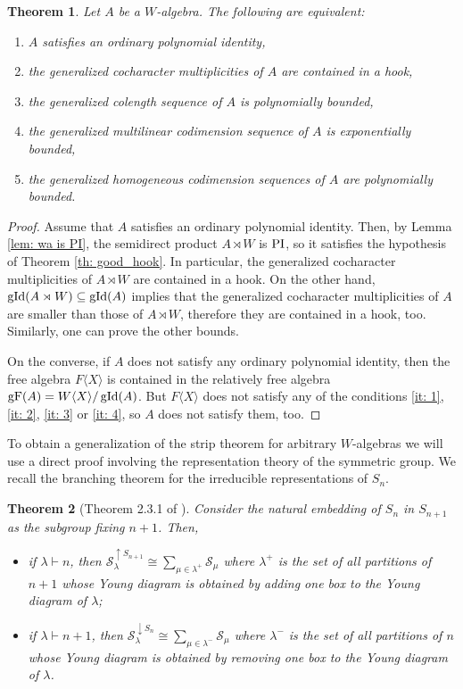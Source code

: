 \documentclass{article}
\newtheorem{theorem}{Theorem}[section]
\newcommand{\wa}{A\rtimes W}
\newcommand{\WX}{W\langle X\rangle}
\newcommand{\cS}{\mathcal{S}}
\DeclareMathOperator{\Polid}{\textnormal{PI}}
\DeclareMathOperator{\gid}{\textnormal{gId}}
\DeclareMathOperator{\F}{gF}
\begin{document}
\begin{theorem}\label{th: hook}
	Let $A$ be a $W$-algebra. The following are equivalent: \begin{enumerate}
		\item $A$ satisfies an ordinary polynomial identity, \label{it: 0}
		\item the generalized cocharacter multiplicities of $A$ are contained in a hook, \label{it: 1}
		\item the generalized colength sequence of $A$ is polynomially bounded, \label{it: 2}
		\item the generalized multilinear codimension sequence of $A$ is exponentially bounded, \label{it: 3}
		\item the generalized homogeneous codimension sequences of $A$ are polynomially bounded. \label{it: 4}
	\end{enumerate}
\end{theorem}
\begin{proof}
	Assume that $A$ satisfies an ordinary polynomial identity. Then, by Lemma \ref{lem: wa is PI}, the semidirect product $\wa$ is $\Polid$, so it satisfies the hypothesis of Theorem \ref{th: good_hook}. In particular, the generalized cocharacter multiplicities of $\wa$ are contained in a hook. On the other hand, $\gid(\wa)\subseteq \gid(A)$ implies that the generalized cocharacter multiplicities of $A$ are smaller than those of $\wa$, therefore they are contained in a hook, too. Similarly, one can prove the other bounds.
	
    On the converse, if $A$ does not satisfy any ordinary polynomial identity, then the free algebra $F\langle X\rangle$ is contained in the relatively free algebra $\F(A)=\WX /\gid(A)$. But $F\langle X\rangle$ does not satisfy any of the conditions \ref{it: 1}, \ref{it: 2}, \ref{it: 3} or \ref{it: 4}, so $A$ does not satisfy them, too.
\end{proof}

To obtain a generalization of the strip theorem for arbitrary $W$-algebras we will use a direct proof involving the representation theory of the symmetric group. We recall the branching theorem for the irreducible representations of $S_n$. 

\begin{theorem}[Theorem 2.3.1 of \cite{GZ05}] \label{th: branching} 
    Consider the natural embedding of $S_n$ in $S_{n+1}$ as the subgroup fixing $n+1$. Then, \begin{itemize}
    \item if $\lambda\vdash n$, then $\cS_\lambda^{\uparrow S_{n+1}}\cong \sum_{\mu\in\lambda^+}\cS_\mu$ where $\lambda^+$ is the set of all partitions of $n+1$ whose Young diagram is obtained by adding one box to the Young diagram of $\lambda$;
    \item if $\lambda\vdash n+1$, then $\cS_\lambda^{\downarrow S_{n}}\cong \sum_{\mu\in\lambda^-}\cS_\mu$ where $\lambda^-$ is the set of all partitions of $n$ whose Young diagram is obtained by removing one box to the Young diagram of $\lambda$.
    \end{itemize}
\end{theorem}
\end{document}
